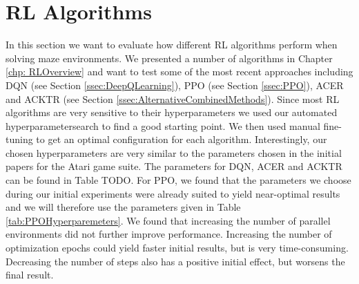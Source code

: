\section{RL Algorithms} \label{sec:EvalRLAlgorithms}
In this section we want to evaluate how different RL algorithms perform when solving maze environments. We presented a number of algorithms in Chapter \ref{chp: RLOverview} and want to test some of the most recent approaches including DQN (see Section \ref{ssec:DeepQLearning}), PPO (see Section \ref{ssec:PPO}), ACER and ACKTR (see Section \ref{ssec:AlternativeCombinedMethods}). Since most RL algorithms are very sensitive to their hyperparameters we used our automated hyperparametersearch to find a good starting point. We then used manual fine-tuning to get an optimal configuration for each algorithm. Interestingly, our chosen hyperparameters are very similar to the parameters chosen in the initial papers for the Atari game suite. The parameters for DQN, ACER and ACKTR can be found in Table TODO. For PPO, we found that the parameters we choose during our initial experiments were already suited to yield near-optimal results and we will therefore use the parameters given in Table \ref{tab:PPOHyperparemeters}. We found that increasing the number of parallel environments did not further improve performance. Increasing the number of optimization epochs could yield faster initial results, but is very time-consuming. Decreasing the number of steps also has a positive initial effect, but worsens the final result.

